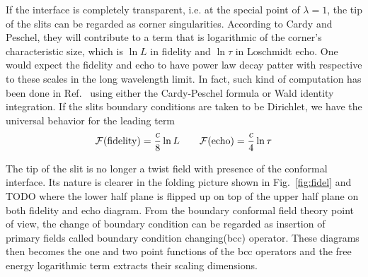 If the interface is completely transparent, i.e. at the special point of $\lambda = 1$, the tip of the slits can be regarded as corner singularities. According to Cardy and Peschel\cite{cardy_finite-size_1988}, they will contribute to a term that is logarithmic of the corner's characteristic size, which is $\ln L$ in fidelity and $\ln \tau$ in Loschmidt echo. One would expect the fidelity and echo to have power law decay patter with respective to these scales in the long wavelength limit. In fact, such kind of computation has been done in Ref.~ using either the Cardy-Peschel formula or Wald identity integration. If the slits boundary conditions are taken to be Dirichlet, we have the universal behavior for the leading term \cite{stephan_logarithmic_2013,stephan_local_2011}
\begin{equation}
\label{eq:full-pass}
\mathcal{F}({\rm fidelity}) =  \frac{c}{8} \ln L \qquad \mathcal{F}( {\rm echo} )  = \frac{c}{4} \ln \tau 
\end{equation}

The tip of the slit is no longer a twist field with presence of the conformal interface. Its nature is clearer in the folding picture shown in Fig.~\ref{fig:fidel} and {\color{red} TODO} where the lower half plane is flipped up on top of the upper half plane on both fidelity and echo diagram. From the boundary conformal field theory point of view, the change of boundary condition can be regarded as insertion of primary fields called boundary condition changing(bcc) operator. These diagrams then becomes the one and two point functions of the bcc operators and the free energy logarithmic term extracts their scaling dimensions. 




